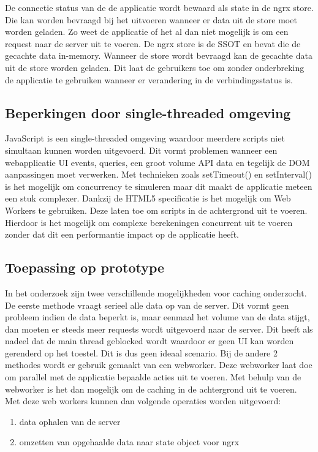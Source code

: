 De connectie status van de de applicatie wordt bewaard als state in de ngrx store. Die kan worden bevraagd bij het uitvoeren wanneer er data uit de store moet worden geladen. Zo weet de applicatie of het al dan niet mogelijk is om een request naar de server uit te voeren. De ngrx store is de SSOT en bevat die de gecachte data in-memory. Wanneer de store wordt bevraagd kan de gecachte data uit de store worden geladen. Dit laat de gebruikers toe om zonder onderbreking de applicatie te gebruiken wanneer er verandering in de verbindingsstatus is.

\subsection{Beperkingen door single-threaded omgeving}
JavaScript is een single-threaded omgeving waardoor meerdere scripts niet simultaan kunnen worden uitgevoerd. Dit vormt problemen wanneer een webapplicatie UI events, queries, een groot volume API data en tegelijk de DOM aanpassingen moet verwerken. Met technieken zoals setTimeout() en setInterval() is het mogelijk om concurrency te simuleren maar dit maakt de applicatie meteen een stuk complexer. Dankzij de HTML5 specificatie is het mogelijk om Web Workers te gebruiken. Deze laten toe om scripts in de achtergrond uit te voeren. Hierdoor is het mogelijk om complexe berekeningen concurrent uit te voeren zonder dat dit een performantie impact op de applicatie heeft.

\subsection{Toepassing op prototype}
In het onderzoek zijn twee verschillende mogelijkheden voor caching onderzocht. De eerste methode vraagt serieel alle data op van de server. Dit vormt geen probleem indien de data beperkt is, maar eenmaal het volume van de data stijgt, dan moeten er steeds meer requests wordt uitgevoerd naar de server. Dit heeft als nadeel dat de main thread geblocked wordt waardoor er geen UI kan worden gerenderd op het toestel. Dit is dus geen ideaal scenario. Bij de andere 2 methodes wordt er gebruik gemaakt van een webworker. Deze webworker laat doe om parallel met de applicatie bepaalde acties uit te voeren. Met behulp van de webworker is het dan mogelijk om de caching in de achtergrond uit te voeren. Met deze web workers kunnen dan volgende operaties worden uitgevoerd:

\begin{enumerate}
\item data ophalen van de server
\item omzetten van opgehaalde data naar state object voor ngrx
\end{enumerate}

